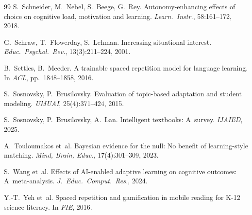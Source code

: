 \documentclass[sigconf]{acmart}
\begin{document}
\begin{thebibliography}{99}
S.~Schneider, M.~Nebel, S.~Beege, G.~Rey. Autonomy-enhancing effects of choice on cognitive load, motivation and learning. {\em Learn.\ Instr.}, 58:161--172, 2018.

G.~Schraw, T.~Flowerday, S.~Lehman. Increasing situational interest. {\em Educ.\ Psychol.\ Rev.}, 13(3):211--224, 2001.

B.~Settles, B.~Meeder. A trainable spaced repetition model for language learning. In {\em ACL}, pp.~1848--1858, 2016.

S.~Sosnovsky, P.~Brusilovsky. Evaluation of topic-based adaptation and student modeling. {\em UMUAI}, 25(4):371--424, 2015.

S.~Sosnovsky, P.~Brusilovsky, A.~Lan. Intelligent textbooks: A~survey. {\em IJAIED}, 2025.

A.~Touloumakos et~al. Bayesian evidence for the null: No benefit of learning-style matching. {\em Mind, Brain, Educ.}, 17(4):301--309, 2023.

S.~Wang et~al. Effects of AI-enabled adaptive learning on cognitive outcomes: A~meta-analysis. {\em J.~Educ.\ Comput.\ Res.}, 2024.

Y.-T.~Yeh et~al. Spaced repetition and gamification in mobile reading for K-12 science literacy. In {\em FIE}, 2016.

\end{thebibliography}
\end{document}
